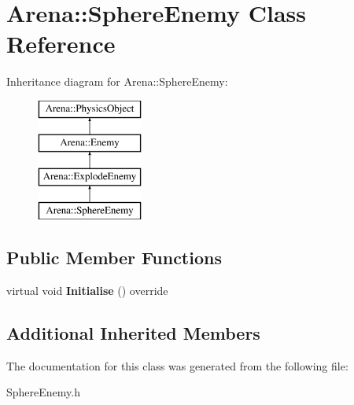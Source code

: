 \hypertarget{class_arena_1_1_sphere_enemy}{\section{Arena\+:\+:Sphere\+Enemy Class Reference}
\label{class_arena_1_1_sphere_enemy}
}
Inheritance diagram for Arena\+:\+:Sphere\+Enemy\+:\begin{figure}[H]
\begin{center}
\leavevmode
\includegraphics[height=4.000000cm]{class_arena_1_1_sphere_enemy}
\end{center}
\end{figure}
\subsection*{Public Member Functions}
\begin{DoxyCompactItemize}
\item 
\hypertarget{class_arena_1_1_sphere_enemy_abf518e2a186e9f2c7dce31338d51386b}{virtual void {\bfseries Initialise} () override}\label{class_arena_1_1_sphere_enemy_abf518e2a186e9f2c7dce31338d51386b}

\end{DoxyCompactItemize}
\subsection*{Additional Inherited Members}


The documentation for this class was generated from the following file\+:\begin{DoxyCompactItemize}
\item 
Sphere\+Enemy.\+h\end{DoxyCompactItemize}
